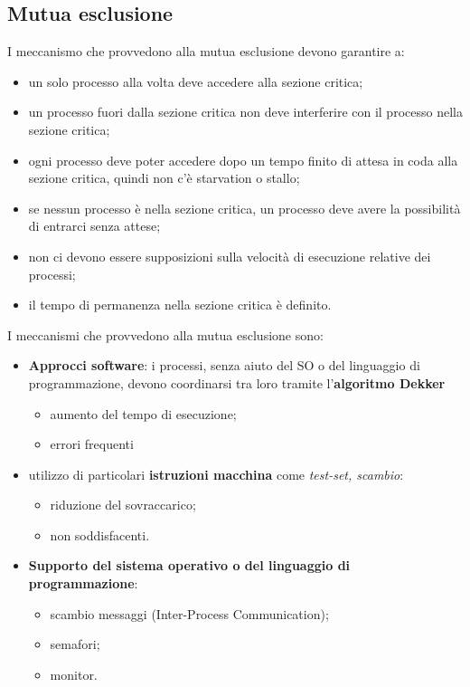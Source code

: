 \documentclass[12pt, letterpaper]{report}
\begin{document}
	\subsection{Mutua esclusione}
	I meccanismo che provvedono alla mutua esclusione devono garantire a:
	\begin{itemize}
		\item un solo processo alla volta deve accedere alla sezione critica;
		\item un processo fuori dalla sezione critica non deve interferire con il processo nella sezione critica;
		\item ogni processo deve poter accedere dopo un tempo finito di attesa in coda alla sezione critica, quindi non c'è starvation o stallo;
		\item se nessun processo è nella sezione critica, un processo deve avere la possibilità di entrarci senza attese;
		\item non ci devono essere supposizioni sulla velocità di esecuzione relative dei processi;
		\item il tempo di permanenza nella sezione critica è definito.
	\end{itemize}
	I meccanismi che provvedono alla mutua esclusione sono:
	\begin{itemize}
		\item \textbf{Approcci software}: i processi, senza aiuto del SO o del linguaggio di programmazione, devono coordinarsi tra loro tramite l'\textbf{algoritmo Dekker}
		\begin{itemize}
			\item aumento del tempo di esecuzione;
			\item errori frequenti
		\end{itemize}
		\item utilizzo di particolari \textbf{istruzioni macchina} come \textit{test-set, scambio}:
		\begin{itemize}
			\item riduzione del sovraccarico;
			\item non soddisfacenti.
		\end{itemize}
		\item \textbf{Supporto del sistema operativo o del linguaggio di programmazione}:
		\begin{itemize}
			\item scambio messaggi (Inter-Process Communication);
			\item semafori;
			\item monitor.
		\end{itemize}
	\end{itemize}
\end{document}
